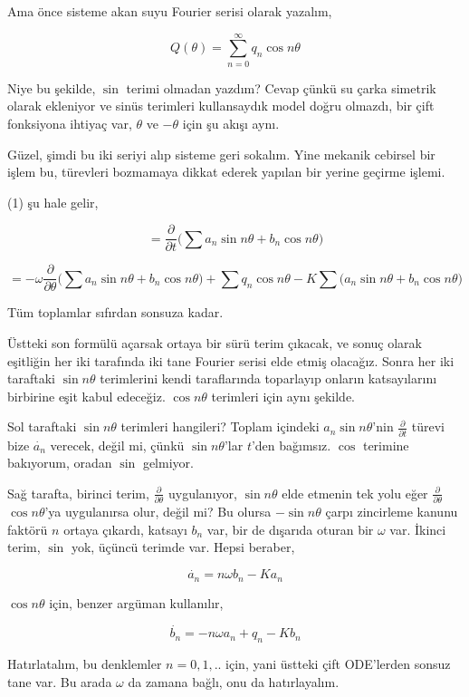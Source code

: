 \documentclass[12pt,fleqn]{article}\usepackage{../../common}
\begin{document}
Ama önce sisteme akan suyu Fourier serisi olarak yazalım, 

$$ 
Q(\theta) = \sum_{n=0}^{\infty} q_n \cos n\theta
$$

Niye bu şekilde, $\sin$ terimi olmadan yazdım?  Cevap çünkü su çarka
simetrik olarak ekleniyor ve sinüs terimleri kullansaydık model doğru
olmazdı, bir çift fonksiyona ihtiyaç var, $\theta$ ve $-\theta$ için şu
akışı aynı. 

Güzel, şimdi bu iki seriyi alıp sisteme geri sokalım. Yine mekanik cebirsel
bir işlem bu, türevleri bozmamaya dikkat ederek yapılan bir yerine geçirme
işlemi.

(1) şu hale gelir, 

$$ 
= \frac{\partial }{\partial t}
\bigg(
  \sum a_n \sin n\theta + b_n \cos n\theta 
\bigg) 
$$

$$ = 
- \omega \frac{\partial }{\partial \theta} 
\bigg( \sum a_n \sin n\theta + b_n \cos n\theta \bigg) + 
\sum  q_n \cos n\theta - 
K \sum \big( a_n \sin n\theta + b_n \cos n\theta \big)
$$

Tüm toplamlar sıfırdan sonsuza kadar. 

Üstteki son formülü açarsak ortaya bir sürü terim çıkacak, ve sonuç olarak
eşitliğin her iki tarafında iki tane Fourier serisi elde etmiş
olacağız. Sonra her iki taraftaki $\sin n\theta$ terimlerini kendi
taraflarında toparlayıp onların katsayılarını birbirine eşit kabul
edeceğiz. $\cos n\theta$ terimleri için aynı şekilde.

Sol taraftaki $\sin n\theta$ terimleri hangileri? Toplam içindeki
$a_n \sin n\theta$'nin $\frac{\partial }{\partial t}$ türevi bize
$\dot{a_n}$ verecek, değil mi, çünkü $\sin n\theta$'lar $t$'den
bağımsız. $\cos$ terimine bakıyorum, oradan $\sin$ gelmiyor.

Sağ tarafta, birinci terim, $\frac{\partial }{\partial \theta}$
uygulanıyor, $\sin n\theta$ elde etmenin tek yolu eğer
$\frac{\partial }{\partial \theta}$ $\cos n\theta$'ya uygulanırsa olur,
değil mi? Bu olursa $-\sin n\theta$ çarpı zincirleme kanunu faktörü $n$
ortaya çıkardı, katsayı $b_n$ var, bir de dışarıda oturan bir $\omega$
var. İkinci terim, $\sin$ yok, üçüncü terimde var. Hepsi beraber,

$$ 
\dot{a_n} = n \omega b_n - K a_n 
$$

$\cos n\theta$ için, benzer argüman kullanılır, 

$$ 
\dot{b_n} = -n \omega a_n + q_n - K b_n 
$$

Hatırlatalım, bu denklemler $n = 0,1,..$ için, yani üstteki çift ODE'lerden
sonsuz tane var. Bu arada $\omega$ da zamana bağlı, onu da hatırlayalım.
\end{document}
